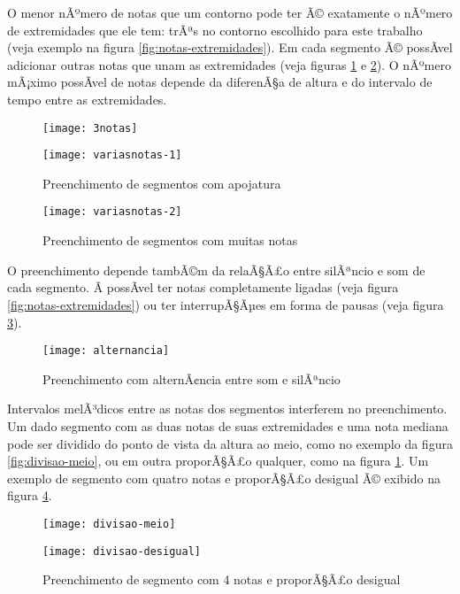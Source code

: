 \documentclass[12pt]{article}
\begin{document}
O menor nÃºmero de notas que um contorno pode ter Ã© exatamente o nÃºmero
de extremidades que ele tem: trÃªs no contorno escolhido para este
trabalho (veja exemplo na figura \ref{fig:notas-extremidades}). Em
cada segmento Ã© possÃ­vel adicionar outras notas que unam as
extremidades (veja figuras \ref{fig:varias-apojatura} e
\ref{fig:muitas-notas}). O nÃºmero mÃ¡ximo possÃ­vel de notas depende da
diferenÃ§a de altura e do intervalo de tempo entre as extremidades.

\begin{figure}[h]
\begin{minipage}{8cm}
  \centering
  \texttt{[image: 3notas]}
  \caption{Preenchimento com notas apenas nas extremidades}
  \label{fig:notas-extremidades}
\end{minipage}
\hfill
\begin{minipage}{8cm}
  \centering
  \texttt{[image: variasnotas-1]}
  \caption{Preenchimento de segmentos com apojatura}
  \label{fig:varias-apojatura}
\end{minipage}
\hfill
\end{figure}

\begin{figure}[h]
  \centering
  \texttt{[image: variasnotas-2]}
  \caption{Preenchimento de segmentos com muitas notas}
  \label{fig:muitas-notas}
\end{figure}

O preenchimento depende tambÃ©m da relaÃ§Ã£o entre silÃªncio e som de cada
segmento. Ã possÃ­vel ter notas completamente ligadas (veja figura
\ref{fig:notas-extremidades}) ou ter interrupÃ§Ãµes em forma de pausas
(veja figura \ref{fig:alternancia}).

\begin{figure}[h]
  \centering
  \texttt{[image: alternancia]}
  \caption{Preenchimento com alternÃ¢ncia entre som e silÃªncio}
  \label{fig:alternancia}
\end{figure}

Intervalos melÃ³dicos entre as notas dos segmentos interferem no
preenchimento. Um dado segmento com as duas notas de suas extremidades
e uma nota mediana pode ser dividido do ponto de vista da altura ao
meio, como no exemplo da figura \ref{fig:divisao-meio}, ou em outra
proporÃ§Ã£o qualquer, como na figura \ref{fig:varias-apojatura}. Um
exemplo de segmento com quatro notas e proporÃ§Ã£o desigual Ã© exibido na
figura \ref{fig:divisao-desigual}.

\begin{figure}[h]
\begin{minipage}{8cm}
  \centering
  \texttt{[image: divisao-meio]}
  \caption{Preenchimento de segmento com 3 notas com proporÃ§Ã£o de 1:1}
  \label{fig:divisao-meio}
\end{minipage}
\hfill
\begin{minipage}{8cm}
  \centering
  \texttt{[image: divisao-desigual]}
  \caption{Preenchimento de segmento com 4 notas e proporÃ§Ã£o desigual}
  \label{fig:divisao-desigual}
\end{minipage}
\hfill
\end{figure}
\end{document}
